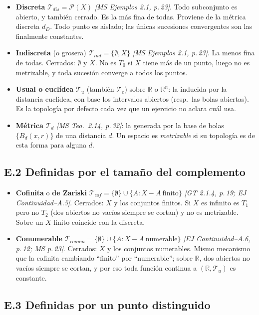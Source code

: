 \documentclass[11pt,a4paper]{article}
\theoremstyle{definition}
\theoremstyle{plain}
\newcommand{\fnt}[1]{{\normalfont\small\itshape\color{gray!150!black}[#1]}}
\newcommand{\R}{\mathbb{R}}
\newcommand{\Bola}[2]{B_d(#1,#2)}
\newcommand{\tp}{\mathcal{T}}
\begin{document}
\begin{itemize}[leftmargin=1.4em,itemsep=3pt]
\item \textbf{Discreta} $\tp_{dis}=\mathcal P(X)$ \fnt{MS Ejemplos 2.1, p.\,23}. Todo subconjunto es abierto, y también cerrado. Es la más fina de todas. Proviene de la métrica discreta $d_D$. Todo punto es aislado; las únicas sucesiones convergentes son las finalmente constantes.
\item \textbf{Indiscreta} (o grosera) $\tp_{ind}=\{\emptyset,X\}$ \fnt{MS Ejemplos 2.1, p.\,23}. La menos fina de todas. Cerrados: $\emptyset$ y $X$. No es $T_0$ si $X$ tiene más de un punto, luego no es metrizable, y toda sucesión converge a todos los puntos.
\item \textbf{Usual o euclídea} $\tp_u$ (también $\tp_e$) sobre $\R$ o $\R^n$: la inducida por la distancia euclídea, con base los intervalos abiertos (resp.\ las bolas abiertas). Es la topología por defecto cada vez que un ejercicio no aclara cuál usa.
\item \textbf{Métrica} $\tp_d$ \fnt{MS Teo.\ 2.14, p.\,32}: la generada por la base de bolas $\{\Bola{x}{r}\}$ de una distancia $d$. Un espacio es \emph{metrizable} si su topología es de esta forma para alguna $d$.
\end{itemize}

\subsection*{E.2 Definidas por el tamaño del complemento}

\begin{itemize}[leftmargin=1.4em,itemsep=3pt]
\item \textbf{Cofinita} o \textbf{de Zariski} $\tp_{cof}=\{\emptyset\}\cup\{A: X-A\ \text{finito}\}$ \fnt{GT 2.1.4, p.\,19; EJ Continuidad--A.5}. Cerrados: $X$ y los conjuntos finitos. Si $X$ es infinito es $T_1$ pero no $T_2$ (dos abiertos no vacíos siempre se cortan) y no es metrizable. Sobre un $X$ finito coincide con la discreta.
\item \textbf{Conumerable} $\tp_{conum}=\{\emptyset\}\cup\{A: X-A\ \text{numerable}\}$ \fnt{EJ Continuidad--A.6, p.\,12; MS p.\,23}. Cerrados: $X$ y los conjuntos numerables. Mismo mecanismo que la cofinita cambiando ``finito'' por ``numerable''; sobre $\R$, dos abiertos no vacíos siempre se cortan, y por eso toda función continua a $(\R,\tp_u)$ es constante.
\end{itemize}

\subsection*{E.3 Definidas por un punto distinguido}
\end{document}
